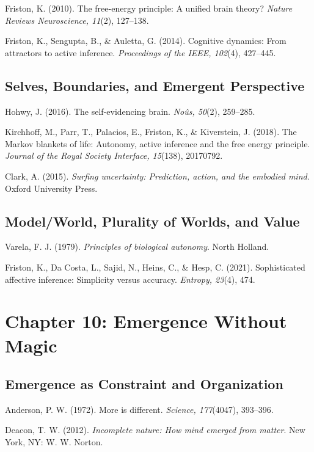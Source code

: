 \documentclass[
  openright]{book}
\begin{document}
Friston, K. (2010). The free-energy principle: A unified brain theory?
\emph{Nature Reviews Neuroscience, 11}(2), 127--138.

Friston, K., Sengupta, B., \& Auletta, G. (2014). Cognitive dynamics:
From attractors to active inference. \emph{Proceedings of the IEEE,
102}(4), 427--445.

\subsection{Selves, Boundaries, and Emergent
Perspective}\label{selves-boundaries-and-emergent-perspective-1}

Hohwy, J. (2016). The self-evidencing brain. \emph{Noûs, 50}(2),
259--285.

Kirchhoff, M., Parr, T., Palacios, E., Friston, K., \& Kiverstein, J.
(2018). The Markov blankets of life: Autonomy, active inference and the
free energy principle. \emph{Journal of the Royal Society Interface,
15}(138), 20170792.

Clark, A. (2015). \emph{Surfing uncertainty: Prediction, action, and the
embodied mind}. Oxford University Press.

\subsection{Model/World, Plurality of Worlds, and
Value}\label{modelworld-plurality-of-worlds-and-value}

Varela, F. J. (1979). \emph{Principles of biological autonomy}. North
Holland.

Friston, K., Da Costa, L., Sajid, N., Heins, C., \& Hesp, C. (2021).
Sophisticated affective inference: Simplicity versus accuracy.
\emph{Entropy, 23}(4), 474.

\section{Chapter 10: Emergence Without
Magic}\label{chapter-10-emergence-without-magic-1}

\subsection{Emergence as Constraint and
Organization}\label{emergence-as-constraint-and-organization}

Anderson, P. W. (1972). More is different. \emph{Science, 177}(4047),
393--396.

Deacon, T. W. (2012). \emph{Incomplete nature: How mind emerged from
matter}. New York, NY: W. W. Norton.
\end{document}
